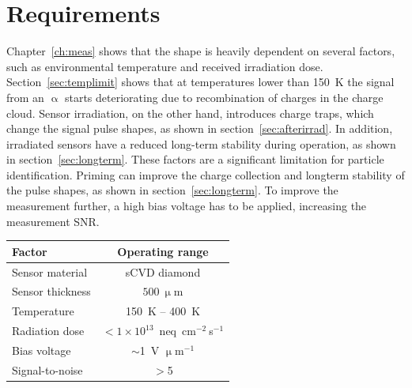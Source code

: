 \section{Requirements}
Chapter~\ref{ch:meas} shows that the shape is heavily dependent on several factors, such as environmental temperature and received irradiation dose. Section~\ref{sec:templimit} shows that at temperatures lower than 150~K the signal from an $\upalpha$ starts deteriorating due to recombination of charges in the charge cloud. Sensor irradiation, on the other hand, introduces charge traps, which change the signal pulse shapes, as shown in section~\ref{sec:afterirrad}. In addition, irradiated sensors have a reduced long-term stability during operation, as shown in section~\ref{sec:longterm}. These factors are a significant limitation for particle identification. Priming can improve the charge collection and longterm stability of the pulse shapes, as shown in section~\ref{sec:longterm}. To improve the measurement further, a high bias voltage has to be applied, increasing the measurement SNR.
\begin{center}
\begin{tabular}{l*{1}{c}}
Factor              & Operating range \\
\hline
Sensor material & sCVD diamond \\
Sensor thickness & $500~\upmu$m \\
Temperature & 150~K -- 400~K \\
Radiation dose & $<1\times10^{13}$~neq~cm$^{-2}~$s$^{-1}$ \\
Bias voltage & $\sim$1~V $\upmu$m$^{-1}$ \\
Signal-to-noise & $>$5 \\
\end{tabular}
\label{tab:limits}
\end{center}



